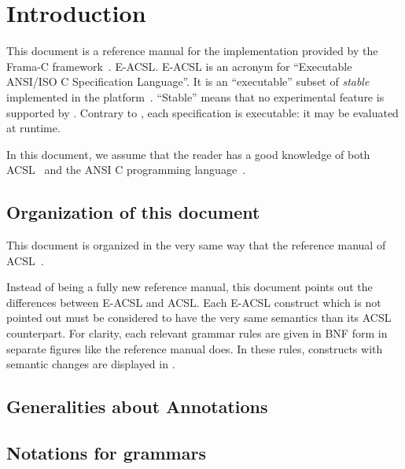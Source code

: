 \chapter{Introduction}

This document is a reference manual for
%
{the \eacsl implementation provided by the Frama-C
  framework~\cite{frama-c}.}%
{E-ACSL.}
E-ACSL is an acronym for ``Executable ANSI/ISO C
Specification Language''. It is an ``executable'' subset of
\emph{stable} \acsl~\cite{acsl} implemented in the \framac
platform~\cite{framac}. ``Stable'' means that no experimental \acsl feature is
supported by \eacsl. Contrary to \acsl, each \eacsl specification is
executable: it may be evaluated at runtime.

In this document, we assume that the reader has a good knowledge of both
ACSL~\cite{acsl} and the ANSI C programming language~\cite{standardc99,KR88}.

\section{Organization of this document}

This document is organized in the very same way that the reference manual of
ACSL~\cite{acsl}.

Instead of being a fully new reference manual, this document points out the
differences between E-ACSL and ACSL. Each E-ACSL construct which is not pointed
out must be considered to have the very same semantics than its ACSL
counterpart. For clarity, each relevant grammar rules are given in BNF form
in separate figures like the \acsl reference manual does. In these rules,
constructs with semantic changes are displayed in .

\section{Generalities about Annotations}\label{sec:gener-about-annot}
\nodiff

\section{Notations for grammars}
\nodiff
